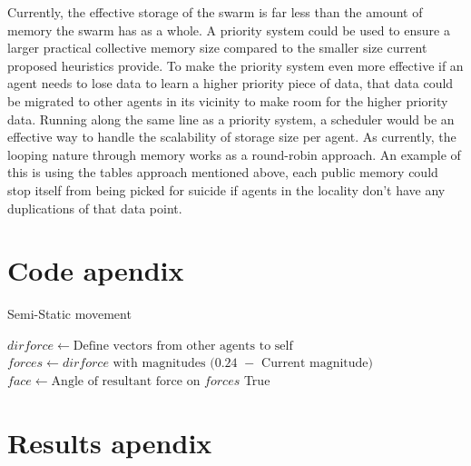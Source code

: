 \documentclass{UoYCSproject}
\begin{document}
Currently, the effective storage of the swarm is far less than the amount of memory the swarm has as a whole.
A priority system could be used to ensure a larger practical collective memory size compared to the smaller size current proposed heuristics provide.
To make the priority system even more effective if an agent needs to lose data to learn a higher priority piece of data, that data could be migrated to other agents in its vicinity to make room for the higher priority data.
Running along the same line as a priority system, a scheduler would be an effective way to handle the scalability of storage size per agent.
As currently, the looping nature through memory works as a round-robin approach.
An example of this is using the tables approach mentioned above, each public memory could stop itself from being picked for suicide if agents in the locality don’t have any duplications of that data point.





\appendix
\chapter{Code apendix}

\begin{algorithm}
\caption{Semi-Static movement}
\label{semistaticmove}
\begin{algorithmic}[1]
\State $dirforce \gets \text{Define vectors from other agents to self}$
\State $forces \gets \text{$dirforce$ with magnitudes $($0.24 $-$ Current magnitude$)$}$
\State
\State {}
\State
\State $face \gets \text{Angle of resultant force on $forces$}$
\State {}
\State
\State \Return True
\EndProcedure
\end{algorithmic}
\end{algorithm}



\chapter{Results apendix}
\end{document}

